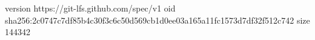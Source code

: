 version https://git-lfs.github.com/spec/v1
oid sha256:2c0747c7df85b4c30f3c6c50d569cb1d0ee03a165a11fc1573d7df32f512c742
size 144342
